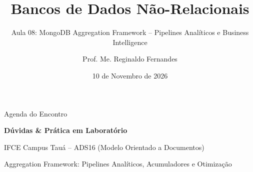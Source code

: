 \documentclass[aspectratio=169,t]{beamer}
\author{Prof. Me. Reginaldo Fernandes}
\institute{Instituto Federal do Ceará -- Campus Tauá \\ Tecnologia em Análise e Desenvolvimento de Sistemas}
\title{Bancos de Dados Não-Relacionais}
\subtitle{Aula 08: MongoDB Aggregation Framework -- Pipelines Analíticos e Business Intelligence}
\date{10 de Novembro de 2026}
\begin{document}

\frame[plain]{\titlepage}

\begin{frame}{Agenda do Encontro}
  \vspace{0.3cm}
  \tableofcontents
\end{frame}







\begin{frame}[plain]
  \vspace{2cm}
  \centering
  {\Huge \textbf{Dúvidas \& Prática em Laboratório}}\par
  \vspace{0.8cm}
  {\large IFCE Campus Tauá -- ADS16 (Modelo Orientado a Documentos)}\par
  \vspace{0.3cm}
  {\normalsize Aggregation Framework: Pipelines Analíticos, Acumuladores e Otimização}
\end{frame}
\end{document}
